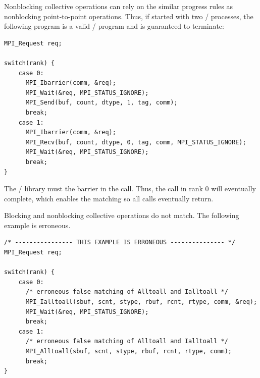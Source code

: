 \begin{example}
\label{coll-nbexN3}
%
%
Nonblocking collective operations can rely on the similar progress rules
as nonblocking point-to-point operations. Thus, if started with two
\MPI/ processes, the following program is a valid \MPI/ program and is
guaranteed to terminate:

\begin{lstlisting}[language={[MPI]C}]
MPI_Request req;

switch(rank) {
    case 0:
      MPI_Ibarrier(comm, &req);
      MPI_Wait(&req, MPI_STATUS_IGNORE);
      MPI_Send(buf, count, dtype, 1, tag, comm);
      break;
    case 1:
      MPI_Ibarrier(comm, &req);
      MPI_Recv(buf, count, dtype, 0, tag, comm, MPI_STATUS_IGNORE);
      MPI_Wait(&req, MPI_STATUS_IGNORE);
      break;
}
\end{lstlisting}

The \MPI/ library must 
the barrier in the 
call. Thus, the  call in rank 0 will eventually
complete, which enables the matching  so all calls
eventually return.

\end{example}

\begin{example}
\label{coll-nbexN4}
%
Blocking and nonblocking collective operations do not match. The
following example is erroneous.

\begin{lstlisting}[language={[MPI]C}]
/* ---------------- THIS EXAMPLE IS ERRONEOUS --------------- */
MPI_Request req;

switch(rank) {
    case 0:
      /* erroneous false matching of Alltoall and Ialltoall */
      MPI_Ialltoall(sbuf, scnt, stype, rbuf, rcnt, rtype, comm, &req);
      MPI_Wait(&req, MPI_STATUS_IGNORE);
      break;
    case 1:
      /* erroneous false matching of Alltoall and Ialltoall */
      MPI_Alltoall(sbuf, scnt, stype, rbuf, rcnt, rtype, comm);
      break;
}
\end{lstlisting}
\end{example}



